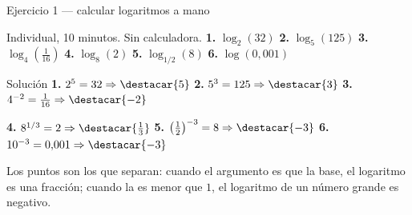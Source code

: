 \documentclass[aspectratio=169,10pt]{beamer}
\begin{document}
\begin{frame}{Ejercicio 1 — calcular logaritmos a mano}
  \scriptsize
  \begin{alertblock}{Individual, 10 minutos. Sin calculadora.}
    \tiny
    \textbf{1.} $\log_{2}(32)$ \qquad
    \textbf{2.} $\log_{5}(125)$ \qquad
    \textbf{3.} $\log_{4}\!\left(\tfrac{1}{16}\right)$ \qquad
    \textbf{4.} $\log_{8}(2)$ \qquad
    \textbf{5.} $\log_{1/2}(8)$ \qquad
    \textbf{6.} $\log(0{,}001)$
  \end{alertblock}

  \vspace{0.06cm}
  \begin{block}{Solución}
    \tiny
    \textbf{1.} $2^{5}=32 \Rightarrow \destacar{5}$ \qquad
    \textbf{2.} $5^{3}=125 \Rightarrow \destacar{3}$ \qquad
    \textbf{3.} $4^{-2}=\tfrac{1}{16} \Rightarrow \destacar{-2}$

    \vspace{0.08cm}
    \textbf{4.} $8^{1/3}=2 \Rightarrow \destacar{\tfrac{1}{3}}$ \qquad
    \textbf{5.} $\left(\tfrac12\right)^{-3}=8 \Rightarrow \destacar{-3}$
    \qquad
    \textbf{6.} $10^{-3}=0{,}001 \Rightarrow \destacar{-3}$
  \end{block}

  \vspace{0.05cm}
  {\tiny\color{uniGris} Los puntos  son los que separan:
  cuando el argumento es  que la base, el logaritmo es una
  fracción; cuando la  es menor que $1$, el logaritmo de un número
  grande es negativo.}
\end{frame}
\end{document}
